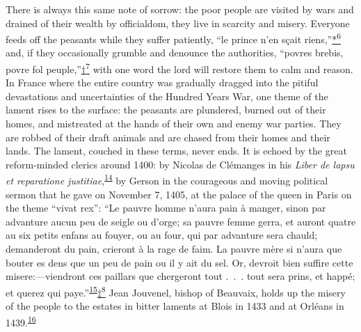 \protect\hypertarget{10_Chapter_Three__THE_HEROIC_DREAM.xhtmlux5cux23page_66}{}{}There
is always this same note of sorrow: the poor people are visited by wars
and drained of their wealth by officialdom, they live in scarcity and
misery. Everyone feeds off the peasants while they suffer patiently,
``le prince n'en sçait
riens,''\protect\hypertarget{10_Chapter_Three__THE_HEROIC_DREAM.xhtmlux5cux23id_2475}{\protect\hyperlink{23_NOTES.xhtmlux5cux23id_2476}{*\textsuperscript{6}}}
and, if they occasionally grumble and denounce the authorities, ``povres
brebis, povre fol
peuple,''\protect\hypertarget{10_Chapter_Three__THE_HEROIC_DREAM.xhtmlux5cux23id_2477}{\protect\hyperlink{23_NOTES.xhtmlux5cux23id_2478}{†\textsuperscript{7}}}
with one word the lord will restore them to calm and reason. In France
where the entire country was gradually dragged into the pitiful
devastations and uncertainties of the Hundred Years War, one theme of
the lament rises to the surface: the peasants are plundered, burned out
of their homes, and mistreated at the hands of their own and enemy war
parties. They are robbed of their draft animals and are chased from
their homes and their lands. The lament, couched in these terms, never
ends. It is echoed by the great reform-minded clerics around 1400: by
Nicolas de Clémanges in his \emph{Liber de lapsu et reparatione
justitiae},\textsuperscript{\protect\hypertarget{10_Chapter_Three__THE_HEROIC_DREAM.xhtmlux5cux23id_1904}{\protect\hyperlink{23_NOTES.xhtmlux5cux23page_405}{14}}}
by Gerson in the courageous and moving political sermon that he gave on
November 7, 1405, at the palace of the queen in Paris on the theme
``vivat rex'': ``Le pauvre homme n'aura pain à manger, sinon par
advanture aucun peu de seigle ou d'orge; sa pauvre femme gerra, et
auront quatre au six petits enfans au fouyer, ou au four, qui par
advanture sera chauld; demanderont du pain, crieront à la rage de faim.
La pauvre mère si n'aura que bouter es dens que un peu de pain ou il y
ait du sel. Or, devroit bien suffire cette misere:---viendront ces
paillars que chergeront tout .~.~. tout sera prins, et happé; et querez
qui
paye.''\textsuperscript{\protect\hypertarget{10_Chapter_Three__THE_HEROIC_DREAM.xhtmlux5cux23id_1902}{\protect\hyperlink{23_NOTES.xhtmlux5cux23id_1903}{15}}}\protect\hypertarget{10_Chapter_Three__THE_HEROIC_DREAM.xhtmlux5cux23id_2479}{\protect\hyperlink{23_NOTES.xhtmlux5cux23id_2480}{‡\textsuperscript{8}}}
Jean Jouvenel, bishop of Beauvaix, holds up the misery of the people to
the estates in bitter laments at Blois in 1433 and at Orléans in
1439.\textsuperscript{\protect\hypertarget{10_Chapter_Three__THE_HEROIC_DREAM.xhtmlux5cux23id_1900}{\protect\hyperlink{23_NOTES.xhtmlux5cux23id_1901}{16}}}
